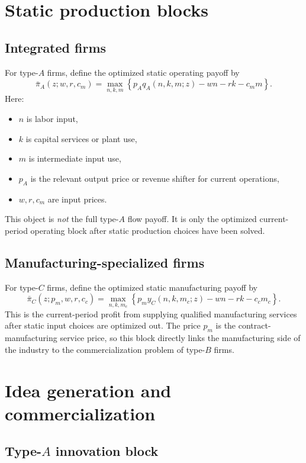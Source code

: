 \documentclass[12pt]{article}
\begin{document}
\section{Static production blocks}

\subsection{Integrated firms}

For type-$A$ firms, define the optimized static operating payoff by
\[
\bar{\pi}_A(z;w,r,c_m)
=
\max_{n,k,m}
\left\{
p_A q_A(n,k,m;z)-wn-rk-c_m m
\right\}.
\]
Here:
\begin{itemize}[leftmargin=2em]
    \item $n$ is labor input,
    \item $k$ is capital services or plant use,
    \item $m$ is intermediate input use,
    \item $p_A$ is the relevant output price or revenue shifter for current operations,
    \item $w,r,c_m$ are input prices.
\end{itemize}
This object is \emph{not} the full type-$A$ flow payoff. It is only the optimized
current-period operating block after static production choices have been solved.

\subsection{Manufacturing-specialized firms}

For type-$C$ firms, define the optimized static manufacturing payoff by
\[
\bar{\pi}_C(z;p_m,w,r,c_c)
=
\max_{n,k,m_c}
\left\{
p_m y_C(n,k,m_c;z)-wn-rk-c_c m_c
\right\}.
\]
This is the current-period profit from supplying qualified manufacturing services
after static input choices are optimized out. The price $p_m$ is the contract-manufacturing
service price, so this block directly links the manufacturing side of the industry
to the commercialization problem of type-$B$ firms.

\section{Idea generation and commercialization}

\subsection{Type-$A$ innovation block}
\end{document}
